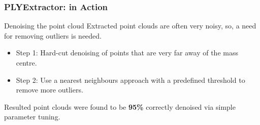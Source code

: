 \documentclass{beamer}
\begin{document}
\begin{frame}\frametitle{PLYExtractor: in Action}

\begin{figure}
\hfill
{}
\hfill
{}
\hfill
\end{figure}


\end{frame}

















\begin{frame}{Denoising the point cloud}
Extracted point clouds are often very noisy, so, a need for removing outliers is needed.

\begin{itemize}
	\item Step 1: Hard-cut denoising of points that are very far away of the mass centre.
	\item Step 2: Use a nearest neighbours approach with a predefined threshold to remove more outliers. 
\end{itemize}

Resulted point clouds were found to be \textbf{95\%} correctly denoised via simple parameter tuning.



\end{frame}
\end{document}
